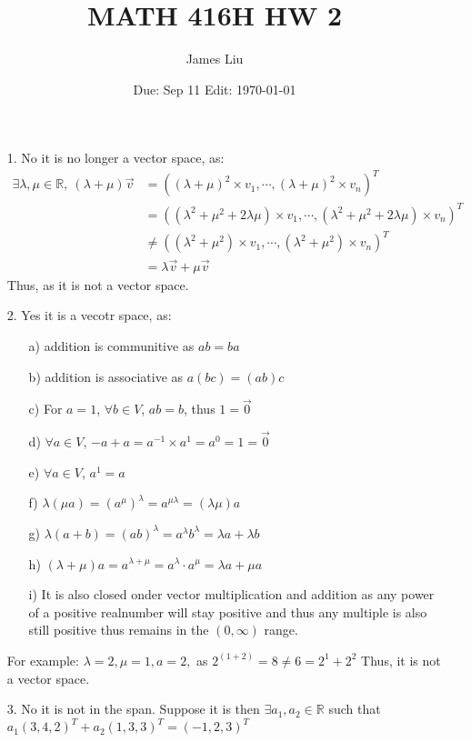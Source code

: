 \documentclass{article}
\date{Due: Sep 11 Edit: \today}
\title{MATH 416H HW 2}
\author{James Liu}
\begin{document}
\maketitle

\begin{itemize}
    \item [1.] No it is no longer a vector space, as:
    \begin{align*}
        \exists \lambda,\mu \in \mathbb{R},\ (\lambda+\mu)\overrightarrow{v}&= ((\lambda+\mu)^2\times v_1,\cdots,(\lambda+\mu)^2\times v_n)^T
        \\ &=((\lambda^2+\mu^2+2\lambda\mu)\times v_1,\cdots,(\lambda^2+\mu^2+2\lambda\mu)\times v_n)^T
        \\ &\neq ((\lambda^2+\mu^2)\times v_1,\cdots,(\lambda^2+\mu^2)\times v_n)^T
        \\ &= \lambda \overrightarrow{v}+\mu\overrightarrow{v}
    \end{align*}
    Thus, as it is not a vector space.
    \item [2.] Yes it is a vecotr space, as:
    \begin{itemize}
        \item [a)] addition is communitive as \(ab = ba\)
        \item [b)] addition is associative as \(a(bc)=(ab)c\)
        \item [c)] For \(a=1\), \(\forall b\in V\), \(ab = b\), thus \(1=\overrightarrow{0}\)
        \item [d)] \(\forall a\in V\), \(-a + a=a^{-1}\times a^1 = a^0 = 1 = \overrightarrow{0} \)
        \item [e)] \(\forall a\in V\), \(a^1 = a\)
        \item [f)] \(\lambda(\mu a) = (a^{\mu})^\lambda = a^{\mu\lambda} = (\lambda\mu)a\)
        \item [g)] \(\lambda(a+b) = (ab)^\lambda = a^\lambda b^\lambda = \lambda a+\lambda b\)
        \item [h)] \((\lambda+\mu)a = a^{\lambda+\mu}=a^{\lambda}\cdot a^{\mu}=\lambda a+\mu a\)
        \item [i)] It is also closed onder vector multiplication and addition as any power of a positive realnumber will stay positive and thus any multiple is also still positive thus remains in the \((0,\infty)\) range.
    \end{itemize}
    For example: \(\lambda=2,\mu=1,a=2,\) as \(2^{(1+2)}=8\neq6=2^1+2^2\)
    Thus, it is not a vector space.
    \item [3.] No it is not in the span. Suppose it is then \(\exists a_1,a_2\in\mathbb{R}\) such that \(a_1(3, 4, 2)^T + a_2(1, 3, 3)^T =(-1,2,3)^T\)

\end{itemize}
\end{document}
